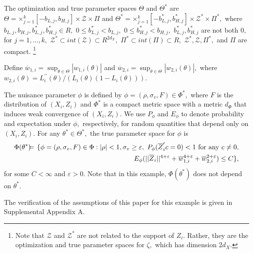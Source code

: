 \documentclass[12pt,thmsb,titlepage,final,oneside,letterpaper]{article}
\begin{document}
The optimization and true parameter spaces $\Theta $ and $\Theta ^{\ast }$
are $\Theta =\mathbf{\times }_{j=1}^{k}[-b_{L,j},b_{H,j}]\times \mathcal{Z}%
\times \Pi $ and $\Theta ^{\ast }=\mathbf{\times }_{j=1}^{k}[-b_{L,j}^{\ast
},b_{H,j}^{\ast }]\times \mathcal{Z}^{\ast }\times \Pi ^{\ast },$ where $%
b_{L,j},b_{H,j},b_{L,j}^{\ast },b_{H,j}^{\ast }\in R,$ $0\leq b_{L,j}^{\ast
}<b_{L,j},$ $0\leq b_{H,j}^{\ast }<b_{H,j},$ $b_{L,j}^{\ast },b_{H,j}^{\ast
} $ are not both $0,$ for $j=1,...,k,$ $\mathcal{Z}^{\ast }\subset int(%
\mathcal{Z})\subset R^{2d_{X}},$ $\Pi ^{\ast }\subset int(\Pi )\subset R,$ $%
\mathcal{Z}^{\ast },\mathcal{Z},\Pi ^{\ast },$ and $\Pi $ are compact.%
\footnote{%
Note that $\mathcal{Z}$ and $\mathcal{Z}^{\ast }$ are not related to the
support of $Z_{i}.$ Rather, they are the optimization and true parameter
spaces for $\zeta ,$ which has dimension $2d_{X}.$}

Define $\overline{w}_{1,i}=\sup_{\theta \in \Theta }|w_{1,i}(\theta )|$ and $%
\overline{w}_{2,i}=\sup_{\theta \in \Theta }|w_{2,i}(\theta )|,$ where $%
w_{2,i}(\theta )=L_{i}^{\prime \prime }(\theta )/$\linebreak $(L_{i}(\theta
)(1-L_{i}(\theta ))).$

The nuisance parameter $\phi $ is defined by $\phi =(\rho ,\sigma _{v},F)\in
\Phi ^{\ast },$ where $F$ is the distribution of $(X_{i},Z_{i})$ and $\Phi
^{\ast }$ is a compact metric space with a metric $d_{\Phi }$ that induces
weak convergence of $(X_{i},Z_{i}).$ We use $P_{\phi }$ and $E_{\phi }$ to
denote probability and expectation under $\phi ,$ respectively, for random
quantities that depend only on $(X_{i},Z_{i}).$ For any $\theta ^{\ast }\in
\Theta ^{\ast },$ the true parameter space for $\phi $ is%
\begin{eqnarray}
\Phi (\theta ^{\ast })\hspace{-0.08in} &=&\hspace{-0.08in}\{\phi =(\rho
,\sigma _{v},F)\in \Phi :|\rho |<1,\sigma _{v}\geq \varepsilon ,\text{ }%
P_{\phi }(\overline{Z}_{i}^{\prime }c=0)<1\text{ for any }c\neq 0,  \notag \\
&&E_{\phi }(||\overline{Z}_{i}||^{4+\varepsilon }+\overline{w}%
_{1,i}^{4+\varepsilon }+\overline{w}_{2,i}^{2+\varepsilon })\overset{}{\leq }%
C\},  \label{Simul Probit Phi Space}
\end{eqnarray}%
for some $C<\infty $ and $\varepsilon >0.$ Note that in this example, $\Phi
(\theta ^{\ast })$ does not depend on $\theta ^{\ast }.$

The verification of the assumptions of this paper for this example is given
in Supplemental Appendix A.
\end{document}
